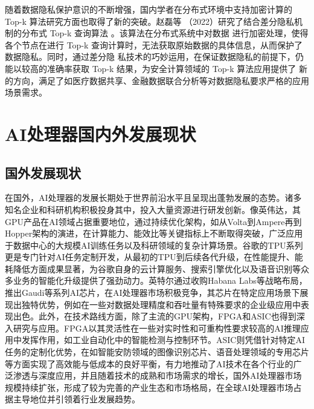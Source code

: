 随着数据隐私保护意识的不断增强，国内学者在分布式环境中支持加密计算的 Top-k 算法研究方面也取得了新的突破。赵磊等
（2022）研究了结合差分隐私机制的分布式 Top-k 查询算法 \cite {zhao2022}。该算法在分布式系统中对数据
进行加密处理，使得各个节点在进行 Top-k 查询计算时，无法获取原始数据的具体信息，从而保护了数据隐私。同时，通过差分隐
私技术的巧妙运用，在保证数据隐私的前提下，仍能以较高的准确率获取 Top-k 结果，为安全计算领域的 Top-k 算法应用提供了
新的方向，满足了如医疗数据共享、金融数据联合分析等对数据隐私要求严格的应用场景需求。

\section{AI处理器国内外发展现状}

\subsection{国外发展现状}
在国外，AI处理器的发展长期处于世界前沿水平且呈现出蓬勃发展的态势。诸多知名企业和科研机构积极投身其中，投入大量资源进行研发创新。像英伟达，其GPU产品在AI领域占据重要地位，通过持续优化架构，如从Volta到Ampere再到Hopper架构的演进，在计算能力、能效比等关键指标上不断取得突破，广泛应用于数据中心的大规模AI训练任务以及科研领域的复杂计算场景。谷歌的TPU系列更是专门针对AI任务定制开发，从最初的TPU到后续各代升级，在性能提升、能耗降低方面成果显著，为谷歌自身的云计算服务、搜索引擎优化以及语音识别等众多业务的智能化升级提供了强劲动力。英特尔通过收购Habana Labs等战略布局，推出Gaudi等系列AI芯片，在AI处理器市场积极竞争，其芯片在特定应用场景下展现出独特优势，例如在一些对数据处理精度和吞吐量有特殊要求的企业级应用中表现出色。此外，在技术路线方面，除了主流的GPU架构，FPGA和ASIC也得到深入研究与应用。FPGA以其灵活性在一些对实时性和可重构性要求较高的AI推理应用中发挥作用，如工业自动化中的智能检测与控制环节。ASIC则凭借针对特定AI任务的定制化优势，在如智能安防领域的图像识别芯片、语音处理领域的专用芯片等方面实现了高效能与低成本的良好平衡，有力地推动了AI技术在各个行业的广泛渗透与深度应用，并且随着技术的成熟和市场需求的增长，国外AI处理器市场规模持续扩张，形成了较为完善的产业生态和市场格局，在全球AI处理器市场占据主导地位并引领着行业发展趋势。

